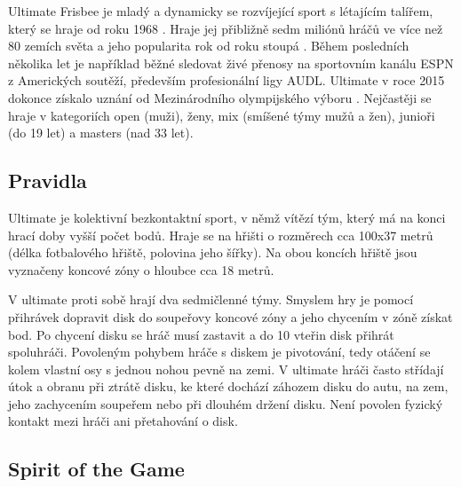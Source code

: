 \documentclass[thesis=B,czech]{FITthesis}[2012/06/26]
\begin{document}

\indent

Ultimate Frisbee je mladý a dynamicky se rozvíjející sport s létajícím talířem,
který se hraje od roku 1968 \cite{cald-o-ultimate}. Hraje jej přibližně sedm miliónů
hráčů ve více než 80 zemích světa a jeho popularita rok od roku stoupá \cite{usa-about-ultimate}.
Během posledních několika let je například běžné sledovat živé přenosy na sportovním kanálu ESPN
z Amerických soutěží, především profesionální ligy AUDL. Ultimate v roce 2015 dokonce získalo
uznání od Mezinárodního olympijského výboru \cite{cald-uznani}. Nejčastěji se hraje v kategoriích
open (muži), ženy, mix (smíšené týmy mužů a žen), junioři (do 19 let) a masters (nad 33 let).

\subsection{Pravidla}


\indent

Ultimate je kolektivní bezkontaktní sport, v němž vítězí tým, který má na konci hrací doby vyšší
počet bodů. Hraje se na hřišti o rozměrech cca 100x37 metrů (délka fotbalového hřiště, polovina
jeho šířky). Na obou koncích hřiště jsou vyznačeny koncové zóny o hloubce cca 18 metrů.

\medskip

V ultimate proti sobě hrají dva sedmičlenné týmy. Smyslem hry je pomocí přihrávek dopravit disk do soupeřovy koncové zóny
a jeho chycením v zóně získat bod. Po chycení disku se hráč musí zastavit a do 10 vteřin disk přihrát spoluhráči.
Povoleným pohybem hráče s diskem je pivotování, tedy otáčení se kolem vlastní osy s jednou nohou pevně na zemi.
V ultimate hráči často střídají útok a obranu při ztrátě disku, ke které dochází záhozem disku do autu, na zem,
jeho zachycením soupeřem nebo při dlouhém držení disku. Není povolen fyzický kontakt mezi hráči ani přetahování o disk.

\subsection{Spirit of the Game}

\indent
\end{document}
